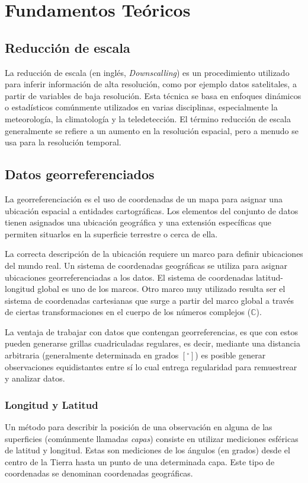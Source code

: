 \chapter{Fundamentos Teóricos}
\label{C2}
\section{Reducción de escala}
La reducción de escala (en inglés, \textit{Downscalling}) es un procedimiento utilizado para inferir 
información de alta resolución, como por ejemplo datos satelitales, a partir de variables de baja 
resolución. Esta técnica se basa en enfoques dinámicos o estadísticos comúnmente utilizados en varias 
disciplinas, especialmente la meteorología, la climatología y la teledetección. El término reducción 
de escala generalmente se refiere a un aumento en la resolución espacial, pero a menudo se usa para la 
resolución temporal.
%
%
%
%
\section{Datos georreferenciados}
La georreferenciación es el uso de coordenadas de un mapa para asignar una ubicación espacial a entidades
cartográficas. Los elementos del conjunto de datos tienen asignados una ubicación geográfica y una extensión específicas
que permiten situarlos en la superficie terrestre o cerca de ella.

La correcta descripción de la ubicación requiere un marco para definir ubicaciones del mundo real. Un sistema de coordenadas geográficas
se utiliza para asignar ubicaciones georreferenciadas a los datos. El sistema de coordenadas latitud-longitud global es uno de los marcos.
Otro marco muy utilizado resulta ser el sistema de coordenadas cartesianas que surge a partir del marco global a través de ciertas transformaciones
en el cuerpo de los números complejos ($\mathbb{C}$).

La ventaja de trabajar con datos que contengan georreferencias, es que con estos pueden generarse grillas cuadriculadas regulares, es decir, mediante una distancia arbitraria (generalmente determinada en grados $[^{\circ}]$)
es posible generar observaciones equidistantes entre sí lo cual entrega regularidad para remuestrear y analizar datos.

    \subsection{Longitud y Latitud}
    Un método para describir la posición de una observación en alguna de las superficies (comúnmente llamadas \textit{capas}) consiste en utilizar 
    mediciones esféricas de latitud y longitud. Estas son mediciones de los ángulos (en grados) desde el centro de la Tierra hasta un punto de una determinada
    capa. Este tipo de coordenadas se denominan coordenadas geográficas.

